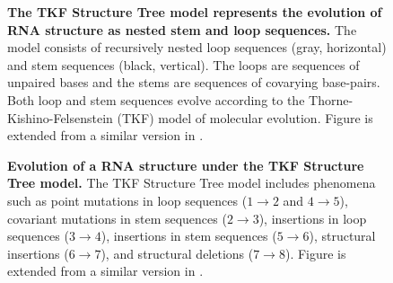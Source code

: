 \documentclass[10pt]{article}
\begin{document}
\begin{figure}[!ht]
  \centering
  \caption{
    \textbf{The TKF Structure Tree model represents the
      evolution of RNA structure as nested stem and loop sequences.}
    The model consists of recursively nested loop sequences (gray,
    horizontal) and stem sequences (black, vertical). The loops are
    sequences of unpaired bases and the stems are sequences of
    covarying base-pairs. Both loop and stem sequences evolve
    according to the Thorne-Kishino-Felsenstein (TKF) model
    \cite{ThorneEtal91} of molecular evolution.  Figure is extended
    from a similar version in \cite{Holmes2004}.
  }
\end{figure}

\begin{figure}[!ht]
  \centering
  \caption{
    \textbf{Evolution of a RNA structure under the TKF Structure Tree
      model.}
    The TKF Structure Tree model includes phenomena such as point
    mutations in loop sequences ($1 \rightarrow 2$ and $4 \rightarrow 5$), covariant
    mutations in stem sequences ($2 \rightarrow 3$), insertions in
    loop sequences ($3 \rightarrow 4$), insertions in stem sequences
    ($5 \rightarrow 6$), structural insertions ($6 \rightarrow 7$),
    and structural deletions ($7 \rightarrow 8$).
   Figure is extended from a similar version in \cite{Holmes2004}.
  }
\end{figure}
\end{document}
